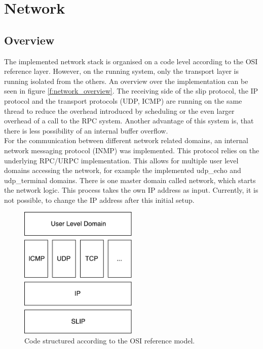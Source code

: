 \section{Network}\label{s:network}
\subsection{Overview}
The implemented network stack is organised on a code level according to the OSI reference layer. However, on the running system, only the transport layer is running isolated from the others. An overview over the implementation can be seen in figure \ref{f:network_overview}. The receiving side of the slip protocol, the IP protocol and the transport protocols (UDP, ICMP) are running on the same thread to reduce the overhead introduced by scheduling or the even larger overhead of a call to the RPC system. Another advantage of this system is, that there is less possibility of an internal buffer overflow.\\
For the communication between different network related domains, an internal network messaging protocol (INMP) was implemented. This protocol relies on the underlying RPC/URPC implementation. This allows for multiple user level domains accessing the network, for example the implemented udp\_echo and udp\_terminal domains. There is one master domain called network, which starts the network logic. This process takes the own IP address as input. Currently, it is not possible, to change the IP address after this initial setup. 

\begin{figure}
\centering
		\includegraphics[width=0.5\textwidth]{Images/Network}
		\caption{Code structured according to the OSI reference model.}
\end{figure}

